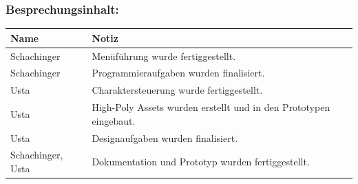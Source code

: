 \subsubsection*{Besprechungsinhalt:}
\begin{tabular}{|m{}|m{}|}
\hline
Name & Notiz \\
\hline
Schachinger & Menüführung wurde fertiggestellt. \\
\hline
Schachinger &  Programmieraufgaben wurden finalisiert. \\
\hline
Usta & Charaktersteuerung wurde fertiggestellt. \\
\hline
Usta & High-Poly Assets wurden erstellt und in den Prototypen eingebaut. \\
\hline
Usta & Designaufgaben wurden finalisiert. \\
\hline
Schachinger, Usta & Dokumentation und Prototyp wurden fertiggestellt. \\
\hline
\end{tabular}